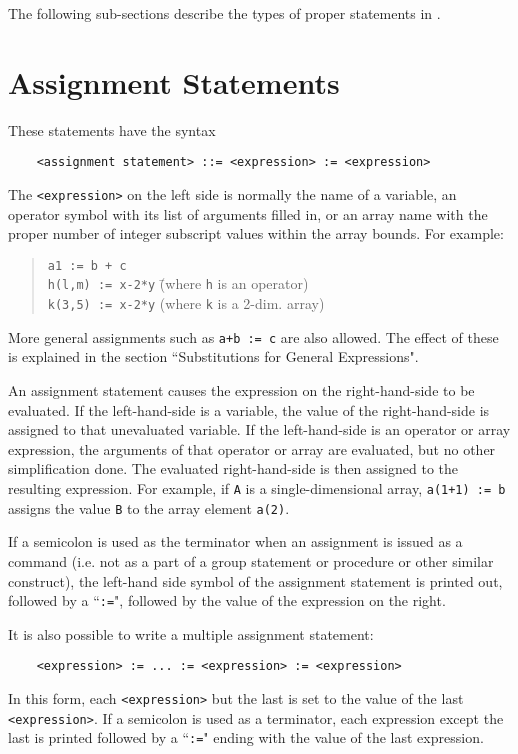 The following sub-sections describe the types of proper statements
 in {\REDUCE}.

\section{Assignment Statements}

These statements have the syntax
\begin{verbatim}
    <assignment statement> ::= <expression> := <expression>
\end{verbatim}
The {\tt <expression>} on the left side is normally the name of a variable, an
operator symbol with its list of arguments filled in, or an array name with
the proper number of integer subscript values within the array bounds. For
example:
\begin{quote}
\begin{tabbing}
{\tt a1 := b + c} \\
{\tt h(l,m) := x-2*y} \hspace{1in} \= (where {\tt h} is an operator) \\
{\tt k(3,5) := x-2*y} \> (where {\tt k} is a 2-dim. array)
\end{tabbing}
\end{quote}
More general assignments such as {\tt a+b := c} are also
allowed.  The effect of these is explained in the section ``Substitutions
for General Expressions".

An assignment statement causes the expression on the right-hand-side to be
evaluated.  If the left-hand-side is a variable, the value of the
right-hand-side is assigned to that unevaluated variable.  If the
left-hand-side is an operator or array expression, the arguments of that
operator or array are evaluated, but no other simplification done.  The
evaluated right-hand-side is then assigned to the resulting expression.
For example, if {\tt A} is a single-dimensional array, {\tt a(1+1) := b}
assigns the value {\tt B} to the array element {\tt a(2)}.

If a semicolon is used as the terminator when an assignment
 is issued as a command (i.e. not as a part of a group
statement or procedure or other similar construct), the left-hand side
symbol of the assignment statement is printed out, followed by a ``{\tt :=}",
followed by the value of the expression on the right.

It is also possible to write a multiple assignment statement:
\begin{verbatim}
    <expression> := ... := <expression> := <expression>
\end{verbatim}
In this form, each {\tt <expression>} but the last is set to the value of
the last {\tt <expression>}.  If a semicolon is used as a terminator, each
expression except the last is printed followed by a ``{\tt :=}" ending
with the value of the last expression.


